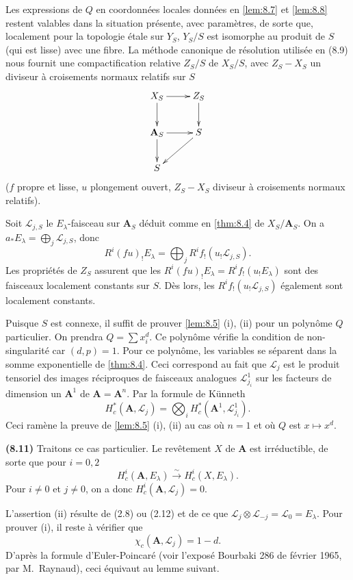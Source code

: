 \documentclass[12pt,a4paper]{amsart}
\theoremstyle{plain}
\theoremstyle{definition}
\theoremstyle{remark}
\numberwithin{equation}{section}
\begin{document}
Les expressions de $Q$ en coordonn\'ees locales donn\'ees en \eqref{lem:8.7} et \eqref{lem:8.8} restent valables dans la situation pr\'esente, avec param\`etres, de sorte que, localement pour la topologie \'etale sur $Y_S$, $Y_S/S$ est isomorphe au produit de $S$ (qui est lisse) avec une fibre. La m\'ethode canonique de r\'esolution utilis\'ee en (8.9) nous fournit une compactification relative $Z_S/S$ de $X_S/S$, avec $Z_S-X_S$ un diviseur \`a croisements normaux relatifs sur $S$
\[
\xymatrix{
X_S \ar[r] \ar[d] & Z_S \ar[d] \\
\mathbf{A}_S \ar[r] \ar[d] & S \ar[dl] \\
S
}
\]
($f$ propre et lisse, $u$ plongement ouvert, $Z_S-X_S$ diviseur \`a croisements normaux relatifs).

Soit $\mathscr{L}_{j,S}$ le $E_\lambda$-faisceau sur $\mathbf{A}_S$ d\'eduit comme en \eqref{thm:8.4} de $X_S/\mathbf{A}_S$. On a $a_\ast E_\lambda = \bigoplus_j \mathscr{L}_{j,S}$, donc
\[
R^i(fu)_! E_\lambda = \bigoplus_j R^i f_! (u_! \mathscr{L}_{j,S}).
\]
Les propri\'et\'es de $Z_S$ assurent que les $R^i(fu)_! E_\lambda = R^i f_! (u_! E_\lambda)$ sont des faisceaux localement constants sur $S$. D\`es lors, les $R^i f_! (u_! \mathscr{L}_{j,S})$ \'egalement sont localement constants.

Puisque $S$ est connexe, il suffit de prouver \eqref{lem:8.5} (i), (ii) pour un polyn\^ome $Q$ particulier. On prendra $Q=\sum x_i^d$. Ce polyn\^ome v\'erifie la condition de non-singularit\'e car $(d,p)=1$. Pour ce polyn\^ome, les variables se s\'eparent dans la somme exponentielle de \eqref{thm:8.4}. Ceci correspond au fait que $\mathscr{L}_j$ est le produit tensoriel des images r\'eciproques de faisceaux analogues $\mathscr{L}_{j_i}^1$ sur les facteurs de dimension un $\mathbf{A}^1$ de $\mathbf{A}=\mathbf{A}^n$. Par la formule de K\"unneth
\[
H^\ast_c(\mathbf{A},\mathscr{L}_j) = \bigotimes_i H^\ast_c(\mathbf{A}^1,\mathscr{L}_{j_i}^1).
\]
Ceci ram\`ene la preuve de \eqref{lem:8.5} (i), (ii) au cas o\`u $n=1$ et o\`u $Q$ est $x\mapsto x^d$.

\noindent \textbf{(8.11)} Traitons ce cas particulier. Le rev\^etement $X$ de $\mathbf{A}$ est irr\'eductible, de sorte que pour $i=0,2$
\[
H^i_c(\mathbf{A},E_\lambda) \xrightarrow{\sim} H^i_c(X,E_\lambda).
\]
Pour $i\not=0$ et $j\not=0$, on a donc $H^i_c(\mathbf{A},\mathscr{L}_j)=0$.

L'assertion (ii) r\'esulte de (2.8) ou (2.12) et de ce que $\mathscr{L}_j\otimes\mathscr{L}_{-j}=\mathscr{L}_0=E_\lambda$. Pour prouver (i), il reste \`a v\'erifier que
\[
\chi_c(\mathbf{A},\mathscr{L}_j) = 1-d.
\]
D'apr\`es la formule d'Euler-Poincar\'e (voir l'expos\'e Bourbaki 286 de f\'evrier 1965, par M.~Raynaud), ceci \'equivaut au lemme suivant.
\end{document}
